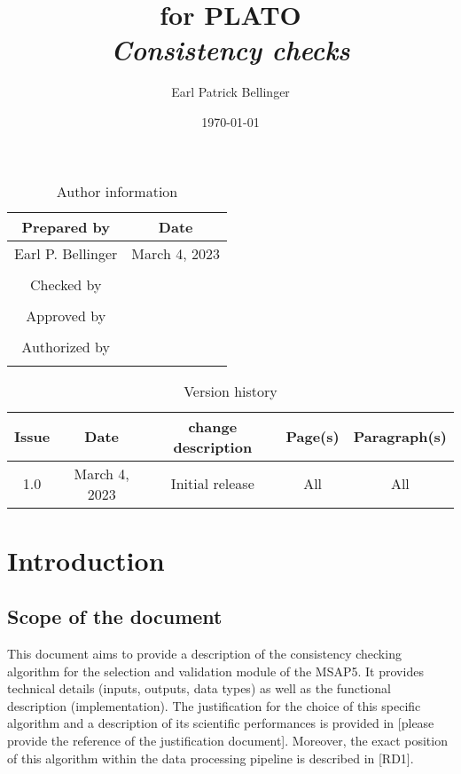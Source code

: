 \documentclass[a4paper, oneside, 11pt, article, english]{memoir}
\author{Earl Patrick Bellinger}
\title{\shorttitle{} for PLATO \\ \Large\textit{Consistency checks}}
\date{\today}
\begin{document}
\maketitle

\begin{table}[htbp]
  \centering
  \caption{Author information}
  \label{tab:author}
  \begin{tabular}{cc}
    \toprule
    Prepared by & Date\\
    \midrule
    Earl P. Bellinger & March 4, 2023 \\
    \\
    Checked by \\
    \midrule
    \\
    Approved by \\
    \midrule
    \\
    Authorized by \\
    \midrule
    \\
    \bottomrule
  \end{tabular}
\end{table}

\begin{table}[htbp]
  \centering
  \caption{Version history}
  \label{tab:version}
  \begin{tabular}{ccccc}
    \toprule
    Issue & Date & \textnumero{} change description & Page(s) & Paragraph(s) \\
    \midrule
    1.0 & March 4, 2023 & Initial release & All & All \\
    \bottomrule
  \end{tabular}
\end{table}


\clearpage
\tableofcontents*
\clearpage


\chapter{Introduction}
\label{chap:intro}

\section{Scope of the document}
\label{sec:scope}

This document aims to provide a description of the consistency checking algorithm for the selection and validation module of the MSAP5. It
provides technical details (inputs, outputs, data types) as well as the
functional description (implementation). The
justification for the choice of this specific algorithm and a description of its
scientific performances is provided in [please provide the reference of the
justification document]. Moreover, the exact position of this algorithm within
the data processing pipeline is described in [RD1]. 
\end{document}

